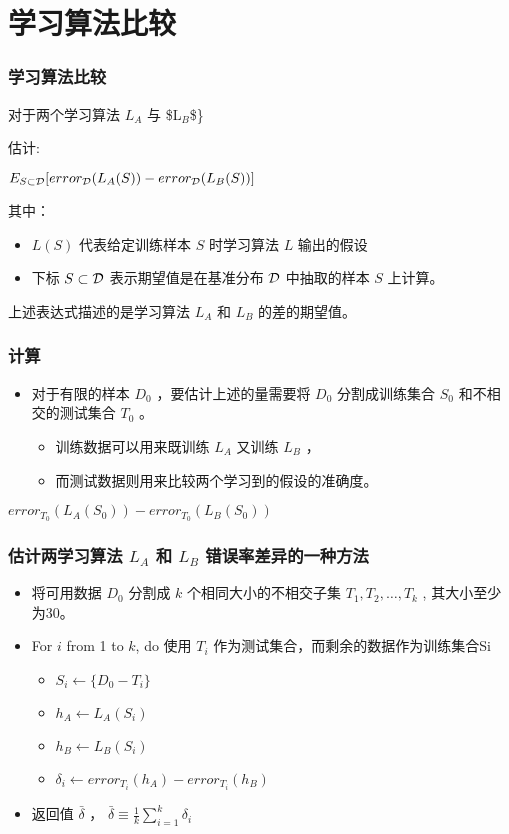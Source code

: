 \documentclass{beamer}
\begin{document}
\section{学习算法比较}
\label{sec-6}
\begin{frame}
\frametitle{学习算法比较}
\label{sec-6-1}


对于两个学习算法 $L_{A}$ 与 \$L$_{B}$\$\}

估计:

$E_{S \subset \cal{D}}[ error_{\cal{D}}(L_{A}(S)) - error_{\cal{D}}(L_{B}(S))]$

其中：

\begin{itemize}
\item $L(S)$ 代表给定训练样本 $S$ 时学习算法 $L$ 输出的假设
\item 下标 $S \subset \cal{D}$ 表示期望值是在基准分布 $\cal{D}$ 中抽取的样本 $S$ 上计算。
\end{itemize}

上述表达式描述的是学习算法 $L_A$ 和 $L_B$ 的差的期望值。
\end{frame}
\begin{frame}
\frametitle{计算}
\label{sec-6-2}


\begin{itemize}
\item 对于有限的样本 $D_0$ ，要估计上述的量需要将 $D_0$ 分割成训练集合 $S_0$ 和不相交的测试集合 $T_0$ 。
\begin{itemize}
\item 训练数据可以用来既训练 $L_A$ 又训练 $L_B$ ，
\item 而测试数据则用来比较两个学习到的假设的准确度。
\end{itemize}
\end{itemize}

$error_{T_{0}}(L_{A}(S_{0})) - error_{T_{0}}(L_{B}(S_{0}))$
\end{frame}
\begin{frame}
\frametitle{估计两学习算法 $L_A$ 和 $L_B$ 错误率差异的一种方法}
\label{sec-6-3}


\begin{itemize}
\item 将可用数据 $D_{0}$ 分割成 $k$ 个相同大小的不相交子集 $T_{1}, T_{2},\ldots, T_{k}$ , 其大小至少为30。
\item For $i$ from 1 to $k$, do
    使用 $T_{i}$ 作为测试集合，而剩余的数据作为训练集合Si
\begin{itemize}
\item $S_{i} \leftarrow \{D_{0} - T_{i}\}$
\item $h_{A} \leftarrow L_{A}(S_{i})$
\item $h_{B} \leftarrow L_{B}(S_{i})$
\item $\delta_{i} \leftarrow error_{T_{i}}(h_{A}) - error_{T_{i}}(h_{B})$
\end{itemize}
\item 返回值 $\bar{\delta}$ ， $\bar{\delta} \equiv \frac{1}{k}\sum_{i=1}^{k} \delta_{i}$
\end{itemize}
\end{frame}
\end{document}
